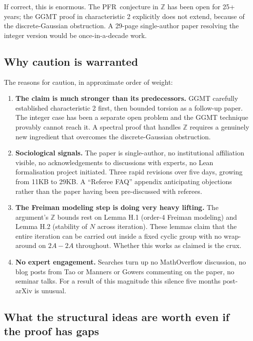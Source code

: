 \documentclass[11pt,a4paper]{article}
\theoremstyle{plain}
\theoremstyle{definition}
\theoremstyle{remark}
\newcommand{\Z}{\mathbb{Z}}
\newcommand{\PFR}{\textsf{PFR}}
\begin{document}
If correct, this is enormous. The \PFR\ conjecture in $\Z$ has been open for 25+ years; the GGMT proof in characteristic 2 explicitly does not extend, because of the discrete-Gaussian obstruction. A 29-page single-author paper resolving the integer version would be once-in-a-decade work.

\subsection{Why caution is warranted}

The reasons for caution, in approximate order of weight:

\begin{enumerate}[leftmargin=2em]
  \item \textbf{The claim is much stronger than its predecessors.} GGMT carefully established characteristic 2 first, then bounded torsion as a follow-up paper. The integer case has been a separate open problem and the GGMT technique provably cannot reach it. A spectral proof that handles $\Z$ requires a genuinely new ingredient that overcomes the discrete-Gaussian obstruction.
  
  \item \textbf{Sociological signals.} The paper is single-author, no institutional affiliation visible, no acknowledgements to discussions with experts, no Lean formalisation project initiated. Three rapid revisions over five days, growing from 11KB to 29KB. A ``Referee FAQ'' appendix anticipating objections rather than the paper having been pre-discussed with referees.
  
  \item \textbf{The Freiman modeling step is doing very heavy lifting.} The argument's $\Z$ bounds rest on Lemma H.1 (order-4 Freiman modeling) and Lemma H.2 (stability of $N$ across iteration). These lemmas claim that the entire iteration can be carried out inside a fixed cyclic group with no wrap-around on $2A - 2A$ throughout. Whether this works as claimed is the crux.
  
  \item \textbf{No expert engagement.} Searches turn up no MathOverflow discussion, no blog posts from Tao or Manners or Gowers commenting on the paper, no seminar talks. For a result of this magnitude this silence five months post-arXiv is unusual.
\end{enumerate}

\subsection{What the structural ideas are worth even if the proof has gaps}
\end{document}
